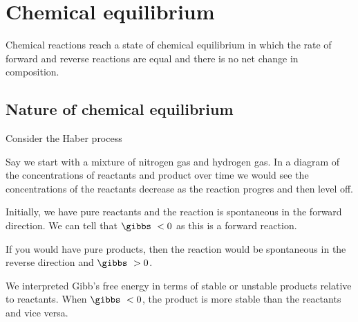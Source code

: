 \documentclass[../mit-general-chemistry.tex]{subfiles}
\begin{document}
\chapter{Chemical equilibrium}





Chemical reactions reach a state of chemical equilibrium in which the
rate of forward and reverse reactions are equal and there is no net
change in composition.


\section{Nature of chemical equilibrium}

Consider the Haber process



Say we start with a mixture of nitrogen gas and hydrogen gas. In a
diagram of the concentrations of reactants and product over time we
would see the concentrations of the reactants decrease as the reaction
progres and then level off.

Initially, we have pure reactants and the reaction is spontaneous in
the forward direction. We can tell that $\gibbs\ < 0$ as this is a
forward reaction.

\begin{center}
\end{center}


If you would have pure products, then the reaction would be
spontaneous in the reverse direction and $\gibbs\ > 0$.


We interpreted Gibb's free energy in terms of stable or unstable
products relative to reactants. When $\gibbs\ < 0$, the product is more
stable than the reactants and vice versa.
\end{document}
